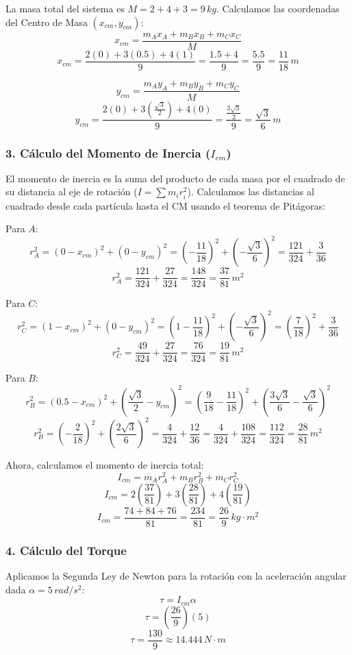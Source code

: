 \documentclass[12pt, a4paper]{article}
\begin{document}
La masa total del sistema es $M = 2 + 4 + 3 = 9 \, \si{kg}$. Calculamos las coordenadas del Centro de Masa $(x_{cm}, y_{cm})$:
$$x_{cm} = \frac{m_A x_A + m_B x_B + m_C x_C}{M}$$
$$x_{cm} = \frac{2(0) + 3(0.5) + 4(1)}{9} = \frac{1.5 + 4}{9} = \frac{5.5}{9} = \frac{11}{18} \, \si{m}$$

$$y_{cm} = \frac{m_A y_A + m_B y_B + m_C y_C}{M}$$
$$y_{cm} = \frac{2(0) + 3\left(\frac{\sqrt{3}}{2}\right) + 4(0)}{9} = \frac{\frac{3\sqrt{3}}{2}}{9} = \frac{\sqrt{3}}{6} \, \si{m}$$

\subsubsection*{3. Cálculo del Momento de Inercia ($I_{cm}$)}
El momento de inercia es la suma del producto de cada masa por el cuadrado de su distancia al eje de rotación ($I = \sum m_i r_i^2$). Calculamos las distancias al cuadrado desde cada partícula hasta el CM usando el teorema de Pitágoras:

Para $A$:
$$r_A^2 = (0 - x_{cm})^2 + (0 - y_{cm})^2 = \left(-\frac{11}{18}\right)^2 + \left(-\frac{\sqrt{3}}{6}\right)^2 = \frac{121}{324} + \frac{3}{36}$$
$$r_A^2 = \frac{121}{324} + \frac{27}{324} = \frac{148}{324} = \frac{37}{81} \, \si{m^2}$$

Para $C$:
$$r_C^2 = (1 - x_{cm})^2 + (0 - y_{cm})^2 = \left(1 - \frac{11}{18}\right)^2 + \left(-\frac{\sqrt{3}}{6}\right)^2 = \left(\frac{7}{18}\right)^2 + \frac{3}{36}$$
$$r_C^2 = \frac{49}{324} + \frac{27}{324} = \frac{76}{324} = \frac{19}{81} \, \si{m^2}$$

Para $B$:
$$r_B^2 = (0.5 - x_{cm})^2 + \left(\frac{\sqrt{3}}{2} - y_{cm}\right)^2 = \left(\frac{9}{18} - \frac{11}{18}\right)^2 + \left(\frac{3\sqrt{3}}{6} - \frac{\sqrt{3}}{6}\right)^2$$
$$r_B^2 = \left(-\frac{2}{18}\right)^2 + \left(\frac{2\sqrt{3}}{6}\right)^2 = \frac{4}{324} + \frac{12}{36} = \frac{4}{324} + \frac{108}{324} = \frac{112}{324} = \frac{28}{81} \, \si{m^2}$$

Ahora, calculamos el momento de inercia total:
$$I_{cm} = m_A r_A^2 + m_B r_B^2 + m_C r_C^2$$
$$I_{cm} = 2\left(\frac{37}{81}\right) + 3\left(\frac{28}{81}\right) + 4\left(\frac{19}{81}\right)$$
$$I_{cm} = \frac{74 + 84 + 76}{81} = \frac{234}{81} = \frac{26}{9} \, \si{kg\cdot m^2}$$

\subsubsection*{4. Cálculo del Torque}
Aplicamos la Segunda Ley de Newton para la rotación con la aceleración angular dada $\alpha = 5 \, \si{rad/s^2}$:
$$\tau = I_{cm} \alpha$$
$$\tau = \left(\frac{26}{9}\right) (5)$$
$$\tau = \frac{130}{9} \approx 14.444 \, \si{N\cdot m}$$
\end{document}
